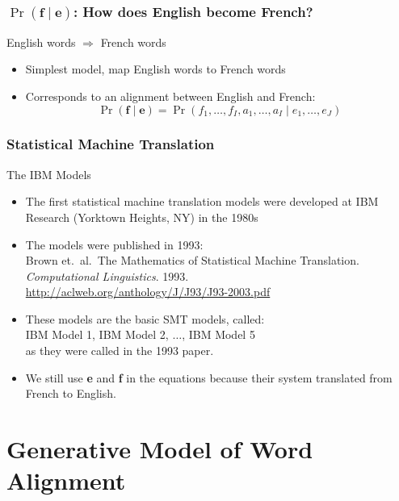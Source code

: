 \begin{frame}
\frametitle{$\Pr( \textbf{f} \mid \textbf{e} )$: How does English become French?}
\begin{alertblock}{English words $\Rightarrow$ French words}
\begin{itemize}
\item Simplest model, map English words to French words
\item Corresponds to an alignment between English and French:
\[ \Pr( \textbf{f} \mid \textbf{e} ) = \Pr(f_1, \ldots, f_I, a_1, \ldots, a_I \mid e_1, \ldots, e_J) \]
\end{itemize}
\end{alertblock}
\end{frame}

\begin{frame}
\frametitle{Statistical Machine Translation}
\begin{block}{The IBM Models}
\begin{itemize}[<+->]
\item The first statistical machine translation models were developed at IBM Research (Yorktown Heights, NY) in the 1980s
\item The models were published in 1993: \\
{\small Brown et.\ al.\ The Mathematics of Statistical Machine Translation. \textit{Computational Linguistics}. 1993.} \\
{\small \url{http://aclweb.org/anthology/J/J93/J93-2003.pdf}}
\item These models are the basic SMT models, called: \\
IBM Model 1, IBM Model 2, $\ldots$, IBM Model 5 \\
as they were called in the 1993 paper.
\item We still use \textbf{e} and \textbf{f} in the equations because their system translated from French to English.
\end{itemize}
\end{block}
\end{frame}


\section{Generative Model of Word Alignment}
\frame{\tableofcontents[currentsection]}

